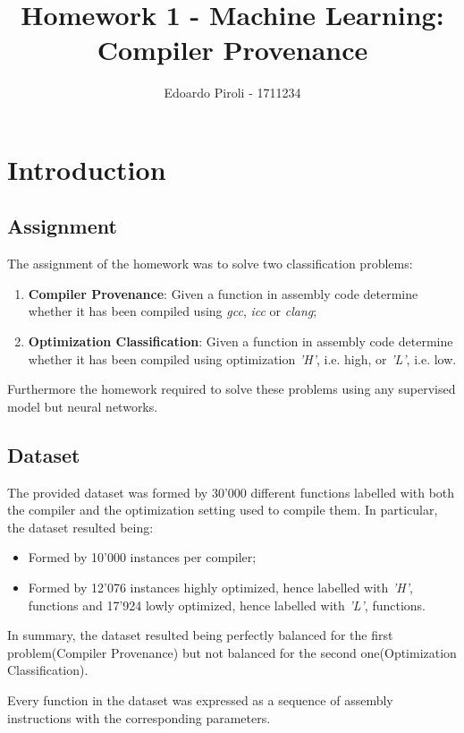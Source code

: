 \documentclass[a4paper]{article}
\title{Homework 1 - Machine Learning: Compiler Provenance}
\author{Edoardo Piroli - 1711234}
\begin{document}
\maketitle
\thispagestyle{empty}

\newpage
\tableofcontents
\thispagestyle{empty}
\newpage


\section{Introduction}
\subsection{Assignment}
The assignment of the homework was to solve two classification problems:
\begin{enumerate}
\item \textbf{Compiler Provenance}: Given a function in assembly code determine whether it has been compiled using \textit{gcc}, \textit{icc} or \textit{clang};
\item \textbf{Optimization Classification}: Given a function in assembly code determine whether it has been compiled using optimization \textit{'H'}, i.e. high, or \textit{'L'}, i.e. low.
\end{enumerate}
Furthermore the homework required to solve these problems using any supervised model but neural networks.

\subsection{Dataset}
The provided dataset was formed by 30'000 different functions labelled with both the compiler and the optimization setting used to compile them. In particular, the dataset resulted being:
\begin{itemize}
\item Formed by 10'000 instances per compiler;
\item Formed by 12'076 instances highly optimized, hence labelled with \textit{'H'}, functions and 17'924 lowly optimized, hence labelled with \textit{'L'}, functions.
\end{itemize}
In summary, the dataset resulted being perfectly balanced for the first problem(Compiler Provenance) but not balanced for the second one(Optimization Classification).

Every function in the dataset was expressed as a sequence of assembly instructions with the corresponding parameters.
\end{document}
